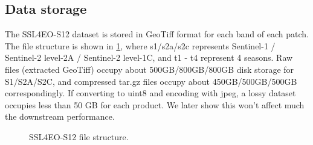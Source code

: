 \documentclass[lettersize,journal]{IEEEtran}
\begin{document}
\begin{table}[h]
\caption{Statistics of Sentinel-2 images in the SSL4EO-S12 dataset.}
\label{tab:stats-s2}
\centering
{}

\end{table}


\subsection{\textbf{Data storage}} The SSL4EO-S12 dataset is stored in GeoTiff format for each band of each patch. The file structure is shown in \cref{fig:file_structure}, where s1/s2a/s2c represents Sentinel-1 / Sentinel-2 level-2A / Sentinel-2 level-1C, and t1 - t4 represent 4 seasons. Raw files (extracted GeoTiff) occupy about 500GB/800GB/800GB disk storage for S1/S2A/S2C, and compressed tar.gz files occupy about 450GB/500GB/500GB correspondingly. If converting to uint8 and encoding with jpeg, a lossy dataset occupies less than 50 GB for each product. We later show this won't affect much the downstream performance.

\begin{figure}[h]
    \centering
    \caption{SSL4EO-S12 file structure.}
    \label{fig:file_structure}
\end{figure}
\end{document}

